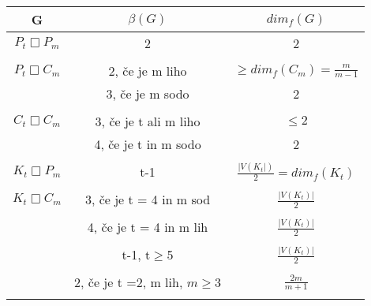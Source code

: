 \documentclass[a4paper]{report}
\begin{document}
	\begin{center}
		\begin{tabular}{ ||c|c|c|| }
			\hline
			G  & $\beta(G)$& $dim_{f}(G)$\\
			\hline
			$P_{t} \Box P_{m} $ & 2& 2 \\
			\hline
			&&\\
			$P_{t} \Box C_{m} $& 2, če je m liho& $ \ge dim_{f}(C_{m})= \frac{m}{m-1}$\\
			& 3, če je m sodo& 2\\
			\hline
			&&\\
			$C_{t} \Box  C_{m}$ & 3, če je t ali m liho& $\le 2 $\\
			&4, če je t in m sodo& 2\\
			\hline
			&&\\
			$K_{t} \Box P_{m}$& t-1 &$\frac{|V(K_{t}|)}{2} = dim_{f}(K_{t})$\\
			\hline
			&&\\
			$K_{t} \Box C_{m}$ & 3, če je t = 4 in m sod& $\frac{|V(K_{t})|}{2}$\\
			&&\\
			&4, če je t = 4 in m lih& $\frac{|V(K_{t})|}{2}$\\
			&&\\
			& t-1, t$\ge$5 &$\frac{|V(K_{t})|}{2}$\\
			&&\\
			&2, če je t =2, m lih, $m\ge 3$ &$\frac{2m}{m+1}$\\
			&&\\
			\hline
			
			\hline
			
		\end{tabular}
	\end{center}
	\newpage
\end{document}
